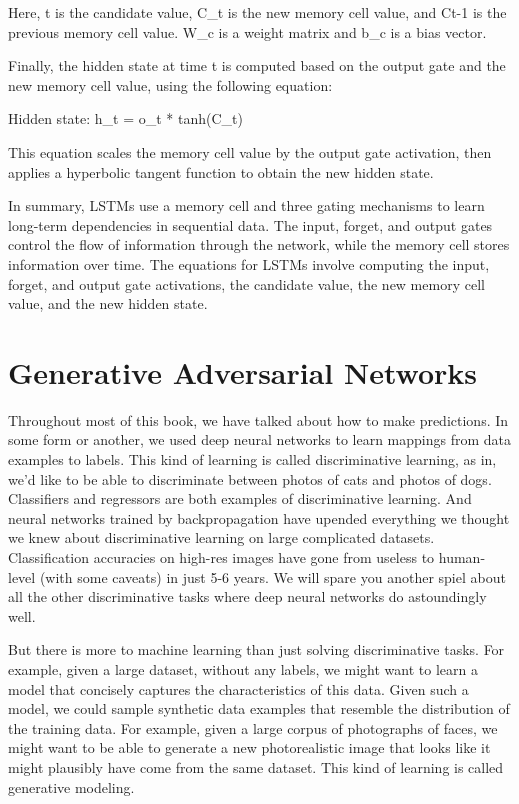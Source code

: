 Here, t is the candidate value, C_t is the new memory cell value, and C{t-1} is the previous memory cell value. W_c is a weight matrix and b_c is a bias vector.

Finally, the hidden state at time t is computed based on the output gate and the new memory cell value, using the following equation:

Hidden state: h_t = o_t * tanh(C_t)

This equation scales the memory cell value by the output gate activation, then applies a hyperbolic tangent function to obtain the new hidden state.

In summary, LSTMs use a memory cell and three gating mechanisms to learn long-term dependencies in sequential data. The input, forget, and output gates control the flow of information through the network, while the memory cell stores information over time. The equations for LSTMs involve computing the input, forget, and output gate activations, the candidate value, the new memory cell value, and the new hidden state.

\section{Generative Adversarial Networks}
\label{sec:3_gans}

Throughout most of this book, we have talked about how to make predictions. In some form or another, we used deep neural networks to learn mappings from data examples to labels. This kind of learning is called discriminative learning, as in, we'd like to be able to discriminate between photos of cats and photos of dogs. Classifiers and regressors are both examples of discriminative learning. And neural networks trained by backpropagation have upended everything we thought we knew about discriminative learning on large complicated datasets. Classification accuracies on high-res images have gone from useless to human-level (with some caveats) in just 5-6 years. We will spare you another spiel about all the other discriminative tasks where deep neural networks do astoundingly well.

But there is more to machine learning than just solving discriminative tasks. For example, given a large dataset, without any labels, we might want to learn a model that concisely captures the characteristics of this data. Given such a model, we could sample synthetic data examples that resemble the distribution of the training data. For example, given a large corpus of photographs of faces, we might want to be able to generate a new photorealistic image that looks like it might plausibly have come from the same dataset. This kind of learning is called generative modeling.

